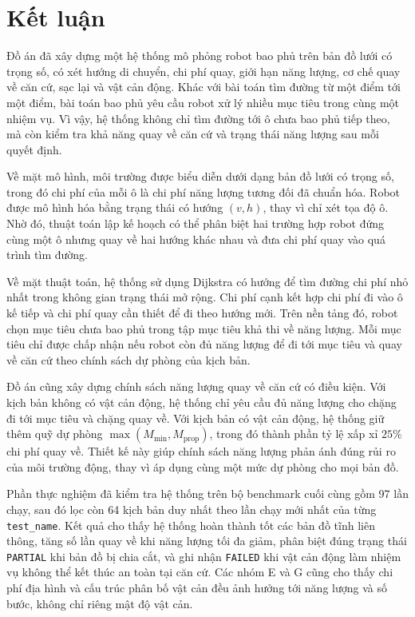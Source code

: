 \documentclass[../DoAn.tex]{subfiles}
\begin{document}
\section{Kết luận}

Đồ án đã xây dựng một hệ thống mô phỏng robot bao phủ trên bản đồ lưới có trọng số, có xét hướng di chuyển, chi phí quay, giới hạn năng lượng, cơ chế quay về căn cứ, sạc lại và vật cản động. Khác với bài toán tìm đường từ một điểm tới một điểm, bài toán bao phủ yêu cầu robot xử lý nhiều mục tiêu trong cùng một nhiệm vụ. Vì vậy, hệ thống không chỉ tìm đường tới ô chưa bao phủ tiếp theo, mà còn kiểm tra khả năng quay về căn cứ và trạng thái năng lượng sau mỗi quyết định.

Về mặt mô hình, môi trường được biểu diễn dưới dạng bản đồ lưới có trọng số, trong đó chi phí của mỗi ô là chi phí năng lượng tương đối đã chuẩn hóa. Robot được mô hình hóa bằng trạng thái có hướng $(v,h)$, thay vì chỉ xét tọa độ ô. Nhờ đó, thuật toán lập kế hoạch có thể phân biệt hai trường hợp robot đứng cùng một ô nhưng quay về hai hướng khác nhau và đưa chi phí quay vào quá trình tìm đường.

Về mặt thuật toán, hệ thống sử dụng Dijkstra có hướng để tìm đường chi phí nhỏ nhất trong không gian trạng thái mở rộng. Chi phí cạnh kết hợp chi phí đi vào ô kế tiếp và chi phí quay cần thiết để đi theo hướng mới. Trên nền tảng đó, robot chọn mục tiêu chưa bao phủ trong tập mục tiêu khả thi về năng lượng. Mỗi mục tiêu chỉ được chấp nhận nếu robot còn đủ năng lượng để đi tới mục tiêu và quay về căn cứ theo chính sách dự phòng của kịch bản.

Đồ án cũng xây dựng chính sách năng lượng quay về căn cứ có điều kiện. Với kịch bản không có vật cản động, hệ thống chỉ yêu cầu đủ năng lượng cho chặng đi tới mục tiêu và chặng quay về. Với kịch bản có vật cản động, hệ thống giữ thêm quỹ dự phòng $\max(M_{\min},M_{\text{prop}})$, trong đó thành phần tỷ lệ xấp xỉ $25\%$ chi phí quay về. Thiết kế này giúp chính sách năng lượng phản ánh đúng rủi ro của môi trường động, thay vì áp dụng cùng một mức dự phòng cho mọi bản đồ.

Phần thực nghiệm đã kiểm tra hệ thống trên bộ benchmark cuối cùng gồm 97 lần chạy, sau đó lọc còn 64 kịch bản duy nhất theo lần chạy mới nhất của từng \texttt{test\_name}. Kết quả cho thấy hệ thống hoàn thành tốt các bản đồ tĩnh liên thông, tăng số lần quay về khi năng lượng tối đa giảm, phân biệt đúng trạng thái \texttt{PARTIAL} khi bản đồ bị chia cắt, và ghi nhận \texttt{FAILED} khi vật cản động làm nhiệm vụ không thể kết thúc an toàn tại căn cứ. Các nhóm E và G cũng cho thấy chi phí địa hình và cấu trúc phân bố vật cản đều ảnh hưởng tới năng lượng và số bước, không chỉ riêng mật độ vật cản.
\end{document}
